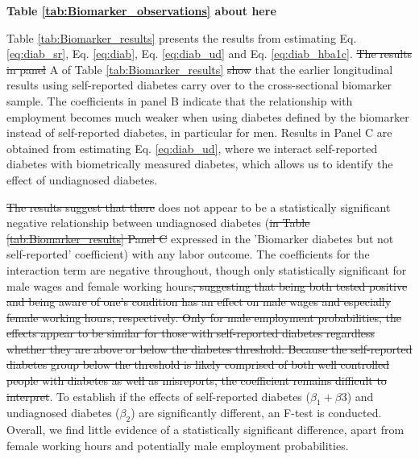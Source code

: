 \documentclass[12pt,english]{article}
\providecommand{\DIFaddtex}[1]{{\protect\color{blue}\uwave{#1}}} %
\providecommand{\DIFdeltex}[1]{{\protect\color{red}\sout{#1}}}                      %
\providecommand{\DIFaddbegin}{} %
\providecommand{\DIFaddend}{} %
\providecommand{\DIFdelbegin}{} %
\providecommand{\DIFdelend}{} %
\providecommand{\DIFadd}[1]{\texorpdfstring{\DIFaddtex{#1}}{#1}} %
\providecommand{\DIFdel}[1]{\texorpdfstring{\DIFdeltex{#1}}{}} %
\begin{document}
\DIFaddend \begin{center}
	\textbf{Table \ref{tab:Biomarker_observations} about here}
\end{center}


Table \ref{tab:Biomarker_results} presents the results from estimating Eq. \ref{eq:diab_sr}, Eq. \ref{eq:diab}, Eq. \ref{eq:diab_ud} and Eq. \ref{eq:diab_hba1c}. \DIFdelbegin \DIFdel{The results in panel }\DIFdelend \DIFaddbegin \DIFadd{Panel }\DIFaddend A of Table \ref{tab:Biomarker_results} \DIFdelbegin \DIFdel{show }\DIFdelend \DIFaddbegin \DIFadd{shows }\DIFaddend that the earlier longitudinal results using self-reported diabetes carry over to the cross-sectional biomarker sample. The coefficients in panel B indicate that the relationship with employment becomes much weaker when using diabetes defined by the biomarker instead of self-reported diabetes, in particular for men. Results in Panel C are obtained from estimating Eq. \ref{eq:diab_ud}, where we interact self-reported diabetes with biometrically measured diabetes, which allows us to identify the effect of undiagnosed diabetes. 

\DIFdelbegin \DIFdel{The results suggest that there }\DIFdelend \DIFaddbegin \DIFadd{There }\DIFaddend does not appear to be a statistically significant negative relationship between undiagnosed diabetes (\DIFdelbegin \DIFdel{in Table \ref{tab:Biomarker_results} Panel C }\DIFdelend expressed in the 'Biomarker diabetes but not self-reported' coefficient) with any labor outcome. The coefficients for the interaction term are negative throughout, though only statistically significant for male wages and female working hours\DIFdelbegin \DIFdel{, suggesting that being both tested positive and being aware of one's condition has an effect on male wages and especially female working hours, respectively. Only for male employment probabilities, the effects appear to be similar for those
with self-reported diabetes regardless whether they are above or below the diabetes threshold.
Because the self-reported diabetes group below the threshold is likely comprised of both
well controlled people with diabetes as well as misreports, the coefficient remains difficult
to interpret}\DIFdelend . To establish if the effects of self-reported diabetes ($\beta_{1} + \beta{3}$) and undiagnosed diabetes ($\beta_{2}$) are significantly different, an F-test is conducted. Overall, we find little evidence of a statistically significant difference, apart from female working hours and potentially male employment probabilities.
\end{document}

